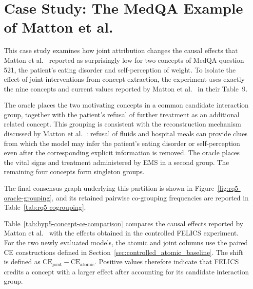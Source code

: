 \section{Case Study: The MedQA Example of Matton et al.}
\label{sec:results-motivating-example}

This case study examines how joint attribution changes the causal effects that Matton et al.~\cite{mattonWalkTalkMeasuring2024} reported as surprisingly low for two concepts of MedQA question 521, the patient's eating disorder and self-perception of weight. To isolate the effect of joint interventions from concept extraction, the experiment uses exactly the nine concepts and current values reported by Matton et al.~\cite{mattonWalkTalkMeasuring2024} in their Table~9.

The oracle places the two motivating concepts in a common candidate interaction group, together with the patient's refusal of further treatment as an additional related concept. This grouping is consistent with the reconstruction mechanism discussed by Matton et al.~\cite{mattonWalkTalkMeasuring2024}: refusal of fluids and hospital meals can provide clues from which the model may infer the patient's eating disorder or self-perception even after the corresponding explicit information is removed. The oracle places the vital signs and treatment administered by EMS in a second group. The remaining four concepts form singleton groups.

The final consensus graph underlying this partition is shown in
Figure~\ref{fig:rq5-oracle-grouping}, and its retained pairwise co-grouping
frequencies are reported in Table~\ref{tab:rq5-cogrouping}.

Table~\ref{tab:hyp5-concept-ce-comparison} compares the causal effects reported by Matton et al.~\cite{mattonWalkTalkMeasuring2024} with the effects obtained in the controlled FELICS experiment. For the two newly evaluated models, the atomic and joint columns use the paired CE constructions defined in Section~\ref{sec:controlled_atomic_baseline}. The shift is defined as $\mathrm{CE}_{\mathrm{joint}}-\mathrm{CE}_{\mathrm{atomic}}$. Positive values therefore indicate that FELICS credits a concept with a larger effect after accounting for its candidate interaction group.

